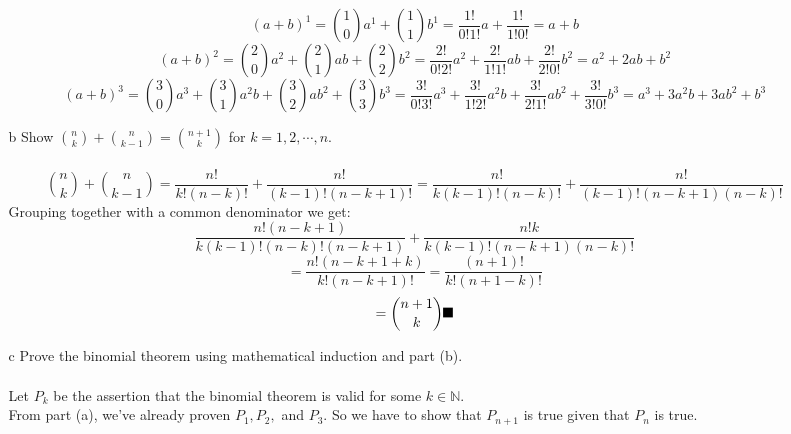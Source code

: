 \begin{itemize}
\begin{itemize}
      $$(a+b)^1 = \binom{1}{0}a^1 + \binom{1}{1}b^1 = \frac{1!}{0!1!}a + \frac{1!}{1!0!} = a + b$$
      $$(a+b)^2 = \binom{2}{0}a^2 + \binom{2}{1}ab + \binom{2}{2}b^2 = \frac{2!}{0!2!}a^2 + \frac{2!}{1!1!}ab + \frac{2!}{2!0!}b^2 = a^2 + 2ab + b^2$$
      $$(a+b)^3 = \binom{3}{0}a^3 + \binom{3}{1}a^2b + \binom{3}{2}ab^2 + \binom{3}{3}b^3 = \frac{3!}{0!3!}a^3 + \frac{3!}{1!2!}a^2b + \frac{3!}{2!1!}ab^2 + \frac{3!}{3!0!}b^3 = a^3 + 3a^2b + 3ab^2 + b^3$$
    \item [b]
      Show $\binom{n}{k} + \binom{n}{k-1} = \binom{n+1}{k}$ for $k = 1,2,\cdots, n$.\\\\

      $$\binom{n}{k} + \binom{n}{k-1} = \frac{n!}{k!(n-k)!} + \frac{n!}{(k-1)!(n-k+1)!} = \frac{n!}{k(k-1)!(n-k)!} + \frac{n!}{(k-1)!(n-k+1)(n-k)!}$$
      Grouping together with a common denominator we get:
      $$\frac{n!(n-k+1)}{k(k-1)!(n-k)!(n-k+1)} + \frac{n!k}{k(k-1)!(n-k+1)(n-k)!}$$
      $$=\frac{n!(n-k+1+k)}{k!(n-k+1)!} = \frac{(n+1)!}{k!(n+1-k)!}$$
      $$=\binom{n+1}{k} \qed$$

    \item [c]
      Prove the binomial theorem using mathematical induction and part (b).\\\\

      Let $P_k$ be the assertion that the binomial theorem is valid for some $k \in \mathds{N}$.\\
      From part (a), we've already proven $P_1, P_2,$ and $P_3$. So we have to show that $P_{n+1}$ is true given that $P_n$ is true.\\
      

\end{itemize}
\end{itemize}
